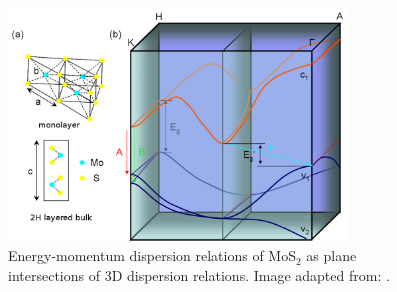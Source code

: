 \begin{figure}[htbp!] 
\centering  
\includegraphics[width=0.8\textwidth]{mos2_band.png}
\caption{Energy-momentum dispersion relations of MoS$_2$ as plane intersections of 3D dispersion relations. Image adapted from: \cite{Mak2010b}. }  
\label{fig:mos2_band}
\end{figure} 

